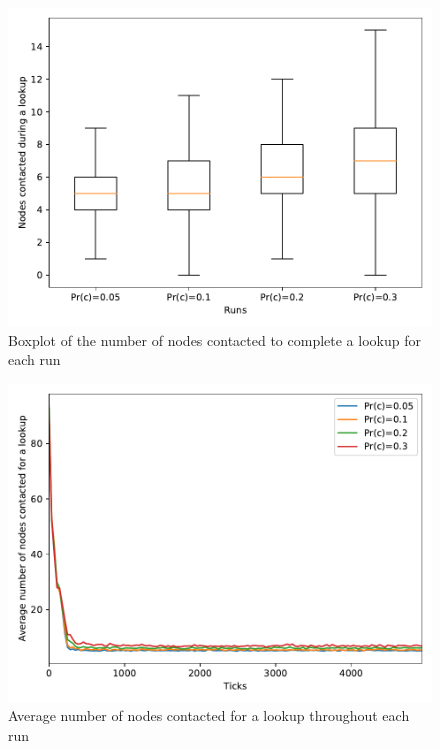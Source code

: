 \documentclass[11pt,twocolumn,letterpaper]{article}
\begin{document}
		\begin{figure}[!ht]
			\centering
			\includegraphics[width=\linewidth,clip,trim=0 0.5cm 0 0.35cm]{figures/analysis1/nodescontacted_box.pdf}
			\caption{Boxplot of the number of nodes contacted to complete a lookup for each run}
			\label{fig:crash3}
		\end{figure}
		\begin{figure}[!ht]
			\centering
			\vspace{-0.7cm}
			\includegraphics[width=\linewidth,clip,trim=0 0.5cm 0 0.35cm]{figures/analysis1/nodescontacted_time.pdf}
			\caption{Average number of nodes contacted for a lookup throughout each run}
			\label{fig:crash4}
		\end{figure}
\end{document}
